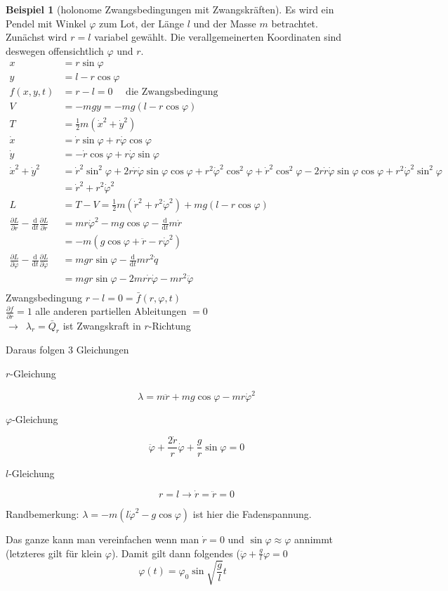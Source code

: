 \documentclass[oneside]{book}
\theoremstyle{definition}
\newtheorem*{beispiel*}{Beispiel}
\newcommand{\conseq}{$\rightarrow$~}
\renewcommand{\d}{\mathrm d}
\newcommand{\dd}[1]{\frac{\d}{\d #1}}
\newcommand{\ffpartial}[2]{\frac{\partial #1}{\partial #2}}
\newcommand{\vp}{\varphi}
\begin{document}
\begin{beispiel*}[holonome Zwangsbedingungen mit Zwangskräften]
Es wird ein Pendel mit Winkel $\varphi$ zum Lot, der Länge $l$ und der Masse $m$ betrachtet.
Zunächst wird $r=l$ variabel gewählt. Die verallgemeinerten Koordinaten sind deswegen offensichtlich $\varphi$ und $r$.
\begin{align*}
x &= r \sin \varphi\\
y &= l - r \cos \varphi\\
f(x,y,t) &= r - l = 0 \text{~~~~die Zwangsbedingung}\\
V &= -mg y = -mg (l -r \cos \varphi)\\
T &= \frac12 m (\dot{x}^2 + \dot{y}^2)\\
\dot{x} &= \dot{r} \sin \varphi + r \dot{\varphi} \cos \varphi\\
\dot{y} &= - \dot{r} \cos \varphi + r \dot{\varphi} \sin \varphi\\
\dot{x}^2 + \dot{y}^2 &= \dot{r}^2 \sin^2 \varphi + 2 r \dot{r} \dot\varphi \sin \varphi \cos \varphi + r^2 \dot{\varphi}^2 \cos^2 \varphi + \dot{r}^2 \cos^2 \varphi - 2 r \dot r \dot \varphi \sin \varphi \cos \varphi + r^2 \dot{\varphi}^2 \sin^2 \varphi \\
&= \dot{r}^2 + r^2 \dot{\varphi}^2\\
L &= T-V = \frac12 m (\dot{r}^2 + r^2 \dot{\varphi}^2) + mg(l - r \cos \varphi)\\
\ffpartial{L}{r} - \dd t \ffpartial{L}{\dot{r}} &= m r \dot{\varphi}^2 - mg \cos \varphi - \dd t m \dot{r} \\
&= -m (g \cos \varphi + \ddot{r} - r \dot{\varphi}^2)\\
\ffpartial{L}{\varphi} - \dd t \ffpartial{L}{\dot{\varphi}} &= mgr \sin \varphi - \dd t m r^2 \dot{q} \\
&= mgr \sin \varphi - 2mr\dot{r}\dot{\varphi} - mr^2 \ddot{\varphi}\\
\end{align*}
Zwangsbedingung $r-l = 0 = \bar{f}(r, \varphi, t)$\\
$\ffpartial{f}{r} = 1$ alle anderen partiellen Ableitungen $= 0$\\
\conseq $\lambda_r = \bar{Q}_r$ ist Zwangskraft in $r$-Richtung

Daraus folgen 3 Gleichungen
\begin{description}
	\item[$r$-Gleichung] $$\lambda = m \ddot{r} + mg \cos \varphi - m r \dot{\varphi}^2$$
	\item[$\varphi$-Gleichung] $$\ddot{\varphi} + \frac{2 \dot{r}}{r} \dot{\varphi} + \frac{g}{r} \sin \varphi = 0$$
	\item[$l$-Gleichung] $$r = l \rightarrow \dot{r} = \ddot{r} = 0 $$
\end{description}
Randbemerkung: $\lambda = -m(l \dot{\varphi}^2 - g \cos \varphi)$ ist hier die Fadenspannung.

Das ganze kann man vereinfachen wenn man $\dot{r} = 0$ und $\sin \varphi \approx \varphi$ annimmt (letzteres gilt für klein $\varphi$). Damit gilt dann folgendes ($\ddot{\vp} + \frac{g}{l} \vp = 0$
$$\varphi(t) = \varphi_0 \sin \sqrt{\frac{g}{l}} t$$
\end{beispiel*}
\end{document}
